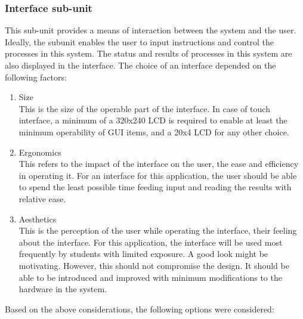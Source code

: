 \subsubsection{Interface sub-unit}
This sub-unit provides a means of interaction between the system and the user. Ideally, the subunit enables the user to input instructions and control the processes in this system. The status and results of processes in this system are also displayed in the interface. The choice of an interface depended on the following factors:
\begin{enumerate}
    \item Size \\
    This is the size of the operable part of the interface. In case of touch interface, a minimum of a 320x240 LCD is required to enable at least the minimum operability of GUI items, and a 20x4 LCD for any other choice.
    \item Ergonomics \\
    This refers to the impact of the interface on the user, the ease and efficiency in operating it. For an interface for this application, the user should be able to spend the least possible time feeding input and reading the results with relative ease. 
    \item Aesthetics \\
    This is the perception of the user while operating the interface, their feeling about the interface. For this application, the interface will be used most frequently by students with limited exposure. A good look might be motivating. However, this should not compromise the design. It should be able to be introduced and improved with minimum modifications to the hardware in the system. 
\end{enumerate}
Based on the above considerations, the following options were considered:
